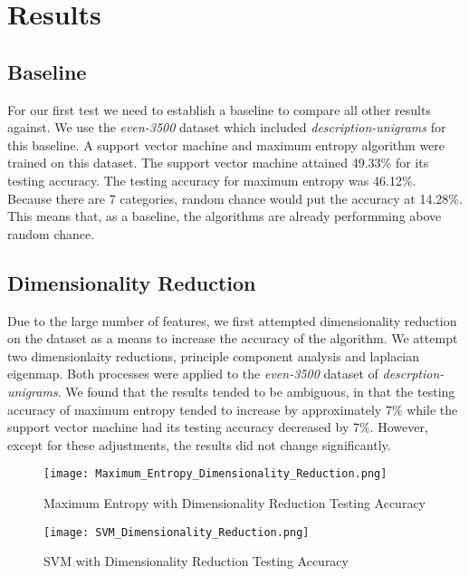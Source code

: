 \section{Results}
\subsection{Baseline}
For our first test we need to establish a baseline to compare all other results against.  We use the \emph{even-3500} dataset which included  \emph{description-unigrams} for this baseline.  A support vector machine and maximum entropy algorithm were trained on this dataset.  The support vector machine attained 49.33\% for its testing accuracy. The testing accuracy for maximum entropy was 46.12\%.  Because there are 7 categories, random chance would put the accuracy at 14.28\%.  This means that, as a baseline, the algorithms are already performming above random chance.

\subsection{Dimensionality Reduction}
Due to the large number of features, we first attempted dimensionality reduction on the dataset as a means to increase the accuracy of the algorithm.  We attempt two dimensionlaity reductions, principle component analysis and laplacian eigenmap. Both processes were applied to the \emph{even-3500} dataset of \emph{descrption-unigrams}.  We found that the results tended to be ambiguous, in that the testing accuracy of maximum entropy tended to increase by approximately 7\% while the support vector machine had its testing accuracy decreased by 7\%.  However, except for these adjustments, the results did not change significantly.
\\

\begin{figure}[!h]
\begin{center}
\caption{Maximum Entropy with Dimensionality Reduction Testing Accuracy}
\texttt{[image: Maximum\_Entropy\_Dimensionality\_Reduction.png]}
\end{center}
\end{figure}

\begin{figure}[!h]
\begin{center}
\caption{SVM with Dimensionality Reduction Testing Accuracy}
\texttt{[image: SVM\_Dimensionality\_Reduction.png]}
\end{center}
\end{figure}

